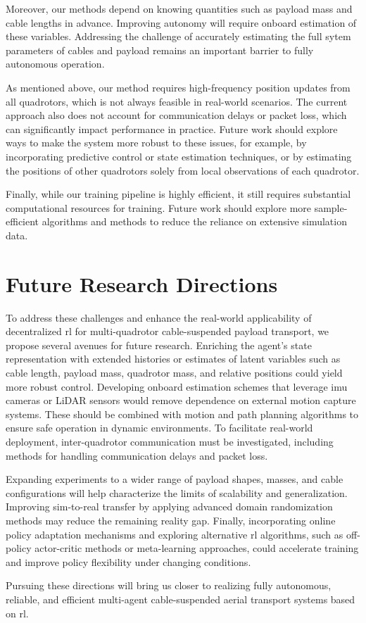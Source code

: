 Moreover, our methods depend on knowing quantities such as payload mass and cable lengths in advance. Improving autonomy will require onboard estimation of these variables. Addressing the challenge of accurately estimating the full sytem parameters of cables and payload remains an important barrier to fully autonomous operation.

As mentioned above, our method requires high-frequency position updates from all quadrotors, which is not always feasible in real-world scenarios. The current approach also does not account for communication delays or packet loss, which can significantly impact performance in practice. Future work should explore ways to make the system more robust to these issues, for example, by incorporating predictive control or state estimation techniques, or by estimating the positions of other quadrotors solely from local observations of each quadrotor.

Finally, while our training pipeline is highly efficient, it still requires substantial computational resources for training. Future work should explore more sample-efficient algorithms and methods to reduce the reliance on extensive simulation data.

\section{Future Research Directions}
To address these challenges and enhance the real-world applicability of decentralized \gls{rl} for multi-quadrotor cable-suspended payload transport, we propose several avenues for future research. Enriching the agent's state representation with extended histories or estimates of latent variables such as cable length, payload mass, quadrotor mass, and relative positions could yield more robust control. Developing onboard estimation schemes that leverage \gls{imu} cameras or LiDAR sensors would remove dependence on external motion capture systems. These should be combined with motion and path planning algorithms to ensure safe operation in dynamic environments. To facilitate real-world deployment, inter-quadrotor communication must be investigated, including methods for handling communication delays and packet loss.

Expanding experiments to a wider range of payload shapes, masses, and cable configurations will help characterize the limits of scalability and generalization. Improving sim-to-real transfer by applying advanced domain randomization methods may reduce the remaining reality gap. Finally, incorporating online policy adaptation mechanisms and exploring alternative \gls{rl} algorithms, such as off-policy actor-critic methods or meta-learning approaches, could accelerate training and improve policy flexibility under changing conditions.

Pursuing these directions will bring us closer to realizing fully autonomous, reliable, and efficient multi-agent cable-suspended aerial transport systems based on \gls{rl}.